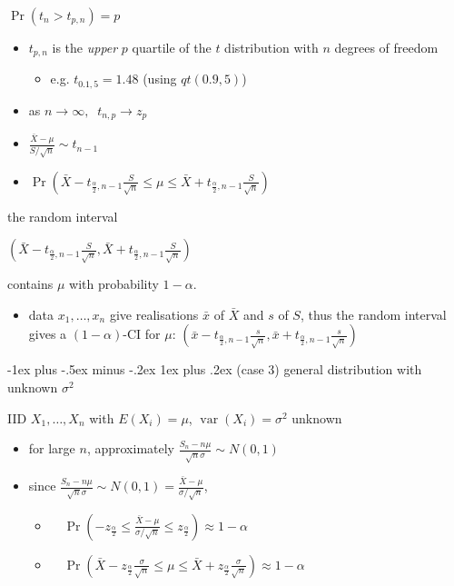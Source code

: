 \documentclass[10pt, landscape]{article}
\makeatletter
\renewcommand{\subsubsection}{\@startsection{subsubsection}{3}{0mm}%
  {-1ex plus -.5ex minus -.2ex}%
  {1ex plus .2ex}%
{\normalfont\small\bfseries}}%
\newcommand{\var}{\mathop{\mathrm{var}}}
\newcommand{\xbar}{\bar{x}}
\newcommand{\Xbar}{\bar{X}}
\newcommand{\seq}[2][n]{#2_1, \dots, #2_{#1}}
\makeatother
\begin{document}
\begin{multicols*}{4}
\begin{tightcenter}
    $\Pr(t_n > t_{p,n}) = p$
  \end{tightcenter}

  \begin{itemize}
    \item $t_{p,n}$ is the \textit{upper} $p$ quartile of the $t$ distribution with $n$ degrees of freedom
      \begin{itemize}
        \item e.g. $t_{0.1,5} = 1.48$ (using $qt(0.9,5)$)
      \end{itemize}
    \item as $n \to \infty, \;\; t_{n,p} \to z_p$
    \item $\frac{\Xbar - \mu}{S/\sqrt n} \sim t_{n-1}$
    \item $\Pr( \Xbar - t_{\frac{\alpha}{2}, n-1} \frac{S}{\sqrt n} \leq \mu \leq \Xbar + t_{\frac{\alpha}{2}, n-1} \frac{S}{\sqrt n})$
  \end{itemize}

  \begin{tightcenter}
    the random interval

    $\left(\Xbar - t_{\frac{\alpha}{2}, n-1} \frac{S}{\sqrt n},  \Xbar + t_{\frac{\alpha}{2}, n-1} \frac{S}{\sqrt n}\right)$

    contains $\mu$ with probability $1-\alpha$.
  \end{tightcenter}

  \begin{itemize}
    \item data $\seq{x}$ give realisations $\xbar$ of $\Xbar$ and $s$ of $S$, thus the random interval gives a $(1-\alpha)$-CI for $\mu$: 
      $\left(\xbar - t_{\frac{\alpha}{2}, n-1} \frac{s}{\sqrt n},  \xbar + t_{\frac{\alpha}{2}, n-1} \frac{s}{\sqrt n}\right)$
  \end{itemize}

  \subsubsection{(case 3) general distribution with unknown $\sigma^2$}

  IID $\seq{X}$ with $E(X_i) =\mu$, $\var(X_i) = \sigma^2$ unknown

  \begin{itemize}
    \item for large $n$, approximately $\frac{S_n - n\mu}{\sqrt n \sigma} \sim N(0,1)$
    \item since $\frac{S_n - n\mu}{\sqrt n \sigma} \sim N(0,1) =  \frac{\Xbar - \mu}{\sigma / \sqrt n}$,
      \begin{itemize}
        \item $\quad \Pr(-z_{\frac{\alpha}{2}} \leq \frac{\Xbar - \mu}{\sigma / \sqrt n} \leq z_{\frac{\alpha}{2}}) \approx 1 - \alpha$
        \item $\quad \Pr(\Xbar-z_{\frac{\alpha}{2}}\frac{\sigma}{\sqrt n} \leq \mu \leq \Xbar + z_{\frac{\alpha}{2}}\frac{\sigma}{\sqrt n}) \approx 1 - \alpha$
      \end{itemize}
  \end{itemize}


\end{multicols*}
\end{document}
